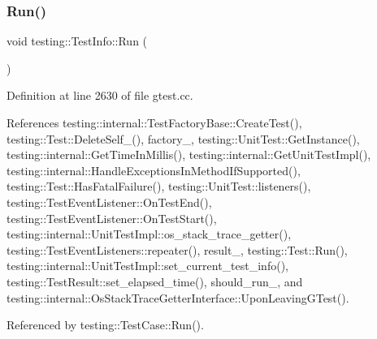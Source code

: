 \subsubsection{\texorpdfstring{Run()}{Run()}}
{\footnotesize\ttfamily void testing\+::\+Test\+Info\+::\+Run (\begin{DoxyParamCaption}{ }\end{DoxyParamCaption})\hspace{0.3cm}{\ttfamily [private]}}



Definition at line 2630 of file gtest.\+cc.



References testing\+::internal\+::\+Test\+Factory\+Base\+::\+Create\+Test(), testing\+::\+Test\+::\+Delete\+Self\+\_\+(), factory\+\_\+, testing\+::\+Unit\+Test\+::\+Get\+Instance(), testing\+::internal\+::\+Get\+Time\+In\+Millis(), testing\+::internal\+::\+Get\+Unit\+Test\+Impl(), testing\+::internal\+::\+Handle\+Exceptions\+In\+Method\+If\+Supported(), testing\+::\+Test\+::\+Has\+Fatal\+Failure(), testing\+::\+Unit\+Test\+::listeners(), testing\+::\+Test\+Event\+Listener\+::\+On\+Test\+End(), testing\+::\+Test\+Event\+Listener\+::\+On\+Test\+Start(), testing\+::internal\+::\+Unit\+Test\+Impl\+::os\+\_\+stack\+\_\+trace\+\_\+getter(), testing\+::\+Test\+Event\+Listeners\+::repeater(), result\+\_\+, testing\+::\+Test\+::\+Run(), testing\+::internal\+::\+Unit\+Test\+Impl\+::set\+\_\+current\+\_\+test\+\_\+info(), testing\+::\+Test\+Result\+::set\+\_\+elapsed\+\_\+time(), should\+\_\+run\+\_\+, and testing\+::internal\+::\+Os\+Stack\+Trace\+Getter\+Interface\+::\+Upon\+Leaving\+G\+Test().



Referenced by testing\+::\+Test\+Case\+::\+Run().


